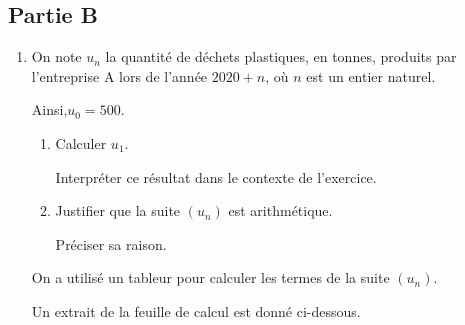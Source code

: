 \documentclass[10pt]{article}
\begin{document}
\subsection*{Partie B}

\begin{enumerate}
\item On note $u_{n}$ la quantité de déchets plastiques, en tonnes, produits par l'entreprise A lors de l'année $2020+n$, où $n$ est un entier naturel.

Ainsi,\quad $u_{0}=500$.
	\begin{enumerate}
		\item Calculer $u_{1}$.

		Interpréter ce résultat dans le contexte de l'exercice.

		\item Justifier que la suite $(u_{n})$ est arithmétique.

		Préciser sa raison.

	\end{enumerate}
		On a utilisé un tableur pour calculer les termes de la suite $(u_{n})$.

		Un extrait de la feuille de calcul est donné ci-dessous.

\begin{center}


\end{center}
\end{enumerate}
\end{document}
